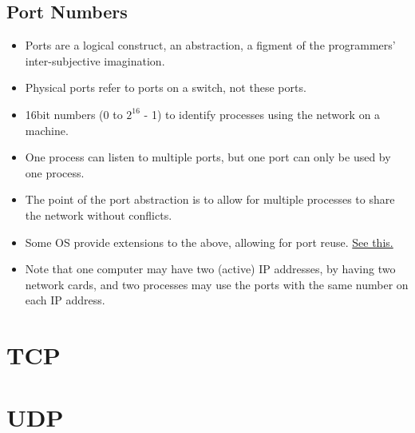 \documentclass{report}
\begin{document}
\subsection{Port Numbers}
\begin{itemize}
\item Ports are a logical construct, an abstraction, a figment of the programmers' inter-subjective imagination.
\item Physical ports refer to ports on a switch, not these ports.
\item 16bit numbers (0 to $2^16$ - 1) to identify processes using the network on a machine.
\item One process can listen to multiple ports, but one port can only be used by one process.
\item The point of the port abstraction is to allow for multiple processes to share the network without conflicts.
\item Some OS provide extensions to the above, allowing for port reuse. \href{https://stackoverflow.com/questions/1694144/can-two-applications-listen-to-the-same-port}{See this.}
\item Note that one computer may have two (active) IP addresses, by having two network cards, and two processes may use
    the ports with the same number on each IP address.
\end{itemize}
\section{TCP}

\section{UDP}
\end{document}
